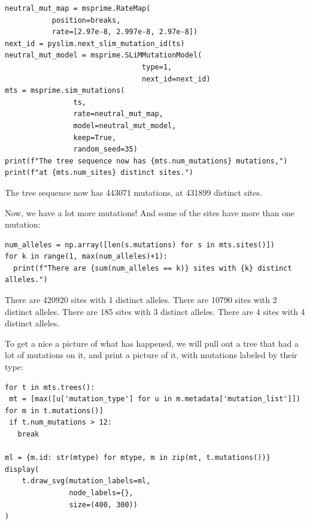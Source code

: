 \documentclass[12pt]{article}
\begin{document}
\begin{listing}[H]
    \begin{verbatim}
neutral_mut_map = msprime.RateMap(
           position=breaks,
           rate=[2.97e-8, 2.997e-8, 2.97e-8])
next_id = pyslim.next_slim_mutation_id(ts)
neutral_mut_model = msprime.SLiMMutationModel(
                                type=1,
                                next_id=next_id)
mts = msprime.sim_mutations(
                ts,
                rate=neutral_mut_map,
                model=neutral_mut_model,
                keep=True, 
                random_seed=35)
print(f"The tree sequence now has {mts.num_mutations} mutations,")
print(f"at {mts.num_sites} distinct sites.")
    \end{verbatim}
\end{listing}

\begin{pycon}
The tree sequence now has 443071 mutations, at 431899 distinct sites.
\end{pycon}

Now, we have a lot more mutations! And some of the sites have more than one mutation:

\begin{listing}[H]
    \begin{verbatim}
num_alleles = np.array([len(s.mutations) for s in mts.sites()])
for k in range(1, max(num_alleles)+1):
  print(f"There are {sum(num_alleles == k)} sites with {k} distinct alleles.")
    \end{verbatim}
\end{listing}
\begin{pycon}
There are 420920 sites with 1 distinct alleles.
There are 10790 sites with 2 distinct alleles.
There are 185 sites with 3 distinct alleles.
There are 4 sites with 4 distinct alleles.
\end{pycon}

To get a nice a picture of what has happened, we will pull out a tree that had a lot of mutations on it,
and print a picture of it, with mutations labeled by their type:

\begin{listing}[H]
    \begin{verbatim}
for t in mts.trees():
 mt = [max([u['mutation_type'] for u in m.metadata['mutation_list']]) for m in t.mutations()]
 if t.num_mutations > 12:
   break

ml = {m.id: str(mtype) for mtype, m in zip(mt, t.mutations())}
display(
    t.draw_svg(mutation_labels=ml,
               node_labels={},
               size=(400, 300))
)
    \end{verbatim}
\end{listing}
\end{document}
